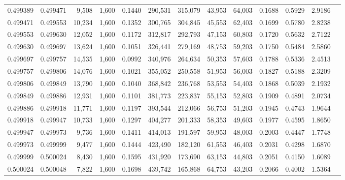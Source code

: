 \begin{tabular}{rrrrrrrrrrrrr}
0.499389 & 0.499471 &  9,508 & 1,600 &                                     0.1440 & 290,531 & 315,079 &  43,953 &  64,003 & 0.1688 & 0.5929 & 2.9186 \\
0.499471 & 0.499553 & 10,234 & 1,600 &                                     0.1352 & 300,765 & 304,845 &  45,553 &  62,403 & 0.1699 & 0.5780 & 2.8238 \\
0.499553 & 0.499630 & 12,052 & 1,600 &                                     0.1172 & 312,817 & 292,793 &  47,153 &  60,803 & 0.1720 & 0.5632 & 2.7122 \\
0.499630 & 0.499697 & 13,624 & 1,600 &                                     0.1051 & 326,441 & 279,169 &  48,753 &  59,203 & 0.1750 & 0.5484 & 2.5860 \\
0.499697 & 0.499757 & 14,535 & 1,600 &                                     0.0992 & 340,976 & 264,634 &  50,353 &  57,603 & 0.1788 & 0.5336 & 2.4513 \\
0.499757 & 0.499806 & 14,076 & 1,600 &                                     0.1021 & 355,052 & 250,558 &  51,953 &  56,003 & 0.1827 & 0.5188 & 2.3209 \\
0.499806 & 0.499849 & 13,790 & 1,600 &                                     0.1040 & 368,842 & 236,768 &  53,553 &  54,403 & 0.1868 & 0.5039 & 2.1932 \\
0.499849 & 0.499886 & 12,931 & 1,600 &                                     0.1101 & 381,773 & 223,837 &  55,153 &  52,803 & 0.1909 & 0.4891 & 2.0734 \\
0.499886 & 0.499918 & 11,771 & 1,600 &                                     0.1197 & 393,544 & 212,066 &  56,753 &  51,203 & 0.1945 & 0.4743 & 1.9644 \\
0.499918 & 0.499947 & 10,733 & 1,600 &                                     0.1297 & 404,277 & 201,333 &  58,353 &  49,603 & 0.1977 & 0.4595 & 1.8650 \\
0.499947 & 0.499973 &  9,736 & 1,600 &                                     0.1411 & 414,013 & 191,597 &  59,953 &  48,003 & 0.2003 & 0.4447 & 1.7748 \\
0.499973 & 0.499999 &  9,477 & 1,600 &                                     0.1444 & 423,490 & 182,120 &  61,553 &  46,403 & 0.2031 & 0.4298 & 1.6870 \\
0.499999 & 0.500024 &  8,430 & 1,600 &                                     0.1595 & 431,920 & 173,690 &  63,153 &  44,803 & 0.2051 & 0.4150 & 1.6089 \\
0.500024 & 0.500048 &  7,822 & 1,600 &                                     0.1698 & 439,742 & 165,868 &  64,753 &  43,203 & 0.2066 & 0.4002 & 1.5364 \\

\end{tabular}
